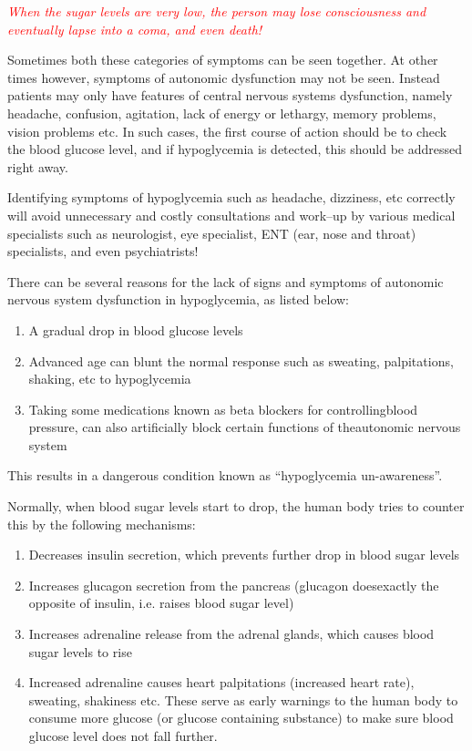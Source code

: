 \textcolor{red}{\textit{When the sugar levels are very low, the person may lose consciousness and eventually lapse into a coma, and even death!}}

Sometimes both these categories of symptoms can be seen together. At other times however, symptoms of autonomic dysfunction may not be seen. Instead patients may only have features of central nervous systems dysfunction, namely headache, confusion, agitation, lack of energy or lethargy, memory problems, vision problems etc. In such cases, the first course of action should be to check the blood glucose level, and if hypoglycemia is detected, this should be addressed right away.

Identifying symptoms of hypoglycemia such as headache, dizziness, etc correctly will avoid unnecessary and costly consultations and work–up by various medical specialists such as neurologist, eye specia\-list, ENT (ear, nose and throat) specialists, and even psychiatrists!

There can be several reasons for the lack of signs and symptoms of autonomic nervous system dysfunction in hypoglycemia, as listed below:

\vspace{-\topsep}
\begin{enumerate}[•]
\itemsep=0pt
\item A gradual drop in blood glucose levels
\item Advanced age can blunt the normal response such as sweating, palpi\-tations, shaking, etc to hypoglycemia
\item Taking some medications known as beta blockers for controlling\break blood pressure, can also artificially block certain functions of the\break autonomic nervous system
\end{enumerate}
\vspace{-\topsep}

\noindent This results in a dangerous condition known as “hypoglycemia un-\break awareness”.


Normally, when blood sugar levels start to drop, the human body tries to counter this by the following mechanisms:
\begin{enumerate}[•]
\itemsep=0pt
\item Decreases insulin secretion, which prevents further drop in blood sugar levels
\item Increases glucagon secretion from the pancreas (glucagon does\break exactly the opposite of insulin, i.e. raises blood sugar level)
\item Increases adrenaline release from the adrenal glands, which causes blood sugar levels to rise
\item Increased adrenaline causes heart palpitations (increased heart rate), sweating, shakiness etc. These serve as early warnings to the human body to consume more glucose (or glucose containing substance) to make sure blood glucose level does not fall further.
\end{enumerate}

